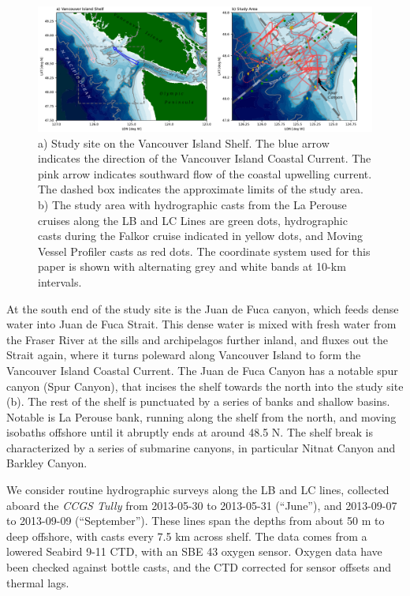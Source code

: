 \documentclass[draft]{agujournal2019}
\begin{document}
\begin{figure}[htbp]
  \includegraphics[width=5in]{LocMapBoth.pdf}
  \caption{a) Study site on the Vancouver Island Shelf.  The blue arrow indicates the direction of the Vancouver Island Coastal Current.  The pink arrow indicates southward flow of the coastal upwelling current.  The dashed box indicates the approximate limits of the study area.  b) The study area with hydrographic casts from the La Perouse cruises along the LB and LC Lines are green dots, hydrographic casts during the Falkor cruise indicated in yellow dots, and Moving Vessel Profiler casts as red dots.  The coordinate system used for this paper is shown with alternating grey and white bands at 10-km intervals.}
  \label{fig:LocMapBoth}
\end{figure}


At the south end of the study site is the Juan de Fuca canyon, which feeds dense water into Juan de Fuca Strait.  This dense water is mixed with fresh water from the Fraser River at the sills and archipelagos further inland, and fluxes out the Strait again, where it turns poleward along Vancouver Island to form the Vancouver Island Coastal Current.  The Juan de Fuca Canyon has a notable spur canyon (Spur Canyon), that incises the shelf towards the north into the study site (b).  The rest of the shelf is punctuated by a series of banks and shallow basins.  Notable is La Perouse bank, running along the shelf from the north, and moving isobaths offshore until it abruptly ends at around 48.5 N. The shelf break is characterized by a series of submarine canyons, in particular Nitnat Canyon and Barkley Canyon.


We consider routine hydrographic surveys along the LB and LC lines, collected aboard the \emph{CCGS Tully} from 2013-05-30 to 2013-05-31  (``June''), and 2013-09-07 to 2013-09-09 (``September'').  These lines span the depths from about 50 m to deep offshore, with casts every 7.5 km across shelf. The data comes from a lowered Seabird 9-11 CTD, with an SBE 43 oxygen sensor.  Oxygen data have been checked against bottle casts, and the CTD corrected for sensor offsets and thermal lags.
\end{document}
